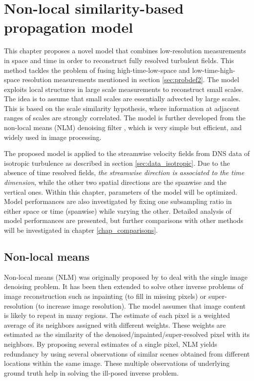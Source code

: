 \chapter{Non-local similarity-based propagation model} 
\label{chap_NLM} 

This chapter proposes a novel model that combines low-resolution measurements in space and time in order to reconstruct fully resolved turbulent fields. This method tackles the problem of fusing high-time-low-space and low-time-high-space resolution measurements mentioned in section \ref{sec:probdef2}. The model exploits local structures in large scale measurements to reconstruct small scales. The idea is to assume that small scales are essentially advected by large scales. This is based on the scale similarity hypothesis, where information at adjacent ranges of scales are strongly correlated. The model is further developed from the non-local means (NLM) denoising filter \citep{buades2005review}, which is very simple but efficient, and widely used in image processing.

The proposed model is applied to the streamwise velocity fields from DNS data of isotropic turbulence as described in section \ref{sec:data_isotropic}. Due to the absence of time resolved fields, \textit{the streamwise direction is associated to the time dimension}, while the other two spatial directions are the spanwise and the vertical ones. Within this chapter, parameters of the model will be optimized. Model performances are also investigated by fixing one subsampling ratio in either space or time (spanwise) while varying the other. Detailed analysis of model performances are presented, but further comparisons with other methods will be investigated in chapter \ref{chap_comparisons}.

\section{Non-local means}
Non-local means (NLM) was originally proposed by \citet{buades2005review} to deal with the single image denoising problem. It has been then extended to solve other inverse problems of image reconstruction such as inpainting (to fill in missing pixels) or super-resolution (to increase image resolution). The model assumes that image content is likely to repeat in many regions. The estimate of each pixel is a weighted average of its neighbors assigned with different weights. These weights are estimated as the similarity of the denoised/inpainted/super-resolved pixel with its neighbors. By proposing several estimates of a single pixel, NLM yields redundancy by using several observations of similar scenes obtained from different locations within the same image. These multiple observations of underlying ground truth help in solving the ill-posed inverse problem.

